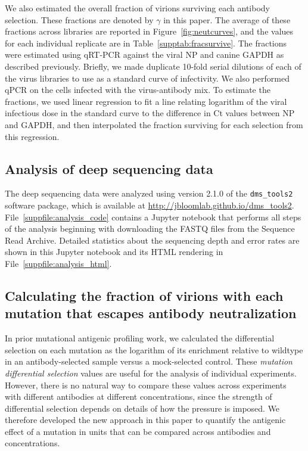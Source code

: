 \documentclass[11pt]{article}
\begin{document}
We also estimated the overall fraction of virions surviving each antibody selection.
These fractions are denoted by $\gamma$ in this paper.
The average of these fractions across libraries are reported in Figure~\ref{fig:neutcurves}, and the values for each individual replicate are in Table~\ref{supptab:fracsurvive}.
The fractions were estimated using qRT-PCR against the viral NP and canine GAPDH as described previously\cite{doud2017complete}.
Briefly, we made duplicate 10-fold serial dilutions of each of the virus libraries to use as a standard curve of infectivity.
We also performed qPCR on the cells infected with the virus-antibody mix.
To estimate the fractions, we used linear regression to fit a line relating logarithm of the viral infectious dose in the standard curve to the difference in Ct values between NP and GAPDH, and then interpolated the fraction surviving for each selection from this regression.

\subsection*{Analysis of deep sequencing data}
The deep sequencing data were analyzed using version 2.1.0 of the \texttt{dms\_tools2} software package\cite{bloom2015software}, which is available at \url{http://jbloomlab.github.io/dms_tools2}.
File~\ref{suppfile:analysis_code} contains a Jupyter notebook that performs all steps of the analysis beginning with downloading the FASTQ files from the Sequence Read Archive.
Detailed statistics about the sequencing depth and error rates are shown in this Jupyter notebook and its HTML rendering in File~\ref{suppfile:analysis_html}.

\subsection*{Calculating the fraction of virions with each mutation that escapes antibody neutralization}
In prior mutational antigenic profiling work\cite{doud2017complete,dingens2017comprehensive}, we calculated the differential selection on each mutation as the logarithm of its enrichment relative to wildtype in an antibody-selected sample versus a mock-selected control.
These \emph{mutation differential selection} values are useful for the analysis of individual experiments.
However, there is no natural way to compare these values across experiments with different antibodies at different concentrations, since the strength of differential selection depends on details of how the pressure is imposed.
We therefore developed the new approach in this paper to quantify the antigenic effect of a mutation in units that can be compared across antibodies and concentrations.
\end{document}

